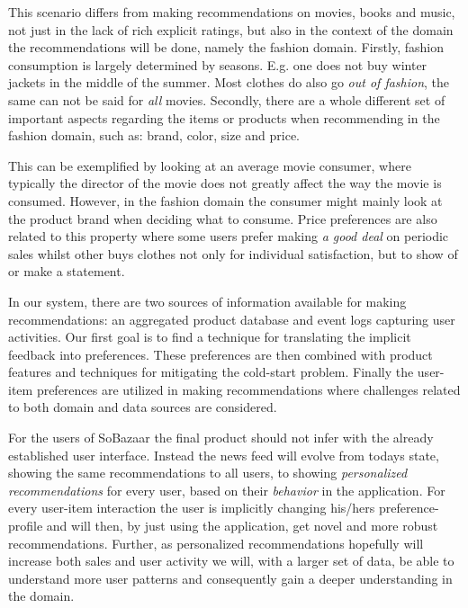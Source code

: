 This scenario differs from making recommendations on movies, books and music,
not just in the lack of rich explicit ratings, but also in the context of the
domain the recommendations will be done, namely the fashion domain. Firstly,
fashion consumption is largely determined by seasons. E.g. one does not buy
winter jackets in the middle of the summer. Most clothes do also go \textit{out of
fashion}, the same can not be said for \emph{all} movies. Secondly, there are a
whole different set of important aspects regarding the items or products when
recommending in the fashion domain, such as: brand, color, size and price.

This can be exemplified by looking at an average movie consumer, where
typically the director of the movie does not greatly affect the way the movie
is consumed. However, in the fashion domain the consumer might mainly look at
the product brand when deciding what to consume. Price preferences are also
related to this property where some users prefer making \textit{a good deal} on
periodic sales whilst other buys clothes not only for individual satisfaction,
but to show of or make a statement.

In our system, there are two sources of information available for making
recommendations: an aggregated product database and event logs capturing user
activities. Our first goal is to find a technique for translating the implicit
feedback into preferences. These preferences are then combined with product
features and techniques for mitigating the cold-start problem. Finally the
user-item preferences are utilized in making recommendations where challenges
related to both domain and data sources are considered.

For the users of SoBazaar the final product should not infer with the already
established user interface. Instead the news feed will evolve from todays
state, showing the same recommendations to all users, to showing
\textit{personalized recommendations} for every user, based on their
\textit{behavior} in the application. For every user-item interaction the user
is implicitly changing his/hers preference-profile and will then, by just using
the application, get novel and more robust recommendations. Further, as
personalized recommendations hopefully will increase both sales and user
activity we will, with a larger set of data, be able to understand more user
patterns and consequently gain a deeper understanding in the domain.

